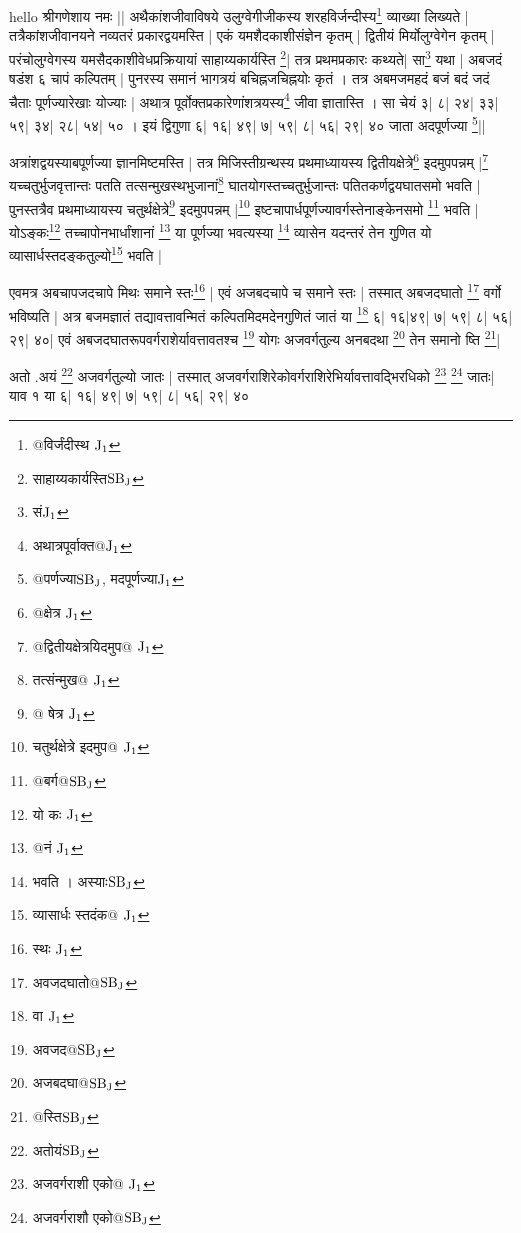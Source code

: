 \documentclass[12pt]{article}
\begin{document}
{\s  hello
श्रीगणेशाय नमः || 
अथैकांशजीवाविषये
उलुग्वेगीजीकस्य
शरहविर्जन्दीस्य\footnote{{\s @विर्जंदीस्थ }${\rm J_1}$}
व्याख्या लिख्यते |
तत्रैकांशजी\-वान\-यने नव्यतरं प्रकारद्वयमस्ति |
एकं यमशैदकाशीसंज्ञेन कृतम् |
द्वितीयं मिर्योलुग्वेगेन कृतम् |
परंचोलुग्वेगस्य यमसैदकाशीवेधप्रक्रियायां
साहाय्यकार्यस्ति \footnote{{\s साहाय्यकार्यस्ति}${\rm SB_J}$}| 
तत्र प्रथमप्रकारः कथ्यते| सा\footnote{{\s सं}${\rm J_1}$} यथा |
अबजदं षडंश ६ चापं कल्पितम् |
पुनरस्य समानं भागत्रयं बचिह्नजचिह्नयोः कृतं । 
तत्र अबमजमहदं बजं बदं जदं चैताः पूर्णज्यारेखाः
योज्याः |
अथात्र पूर्वोक्तप्रकारेणांशत्रयस्य\footnote{{\s अथात्रपूर्वाक्त@}${\rm J_1}$}
जीवा ज्ञातास्ति । सा चेयं ३| ८| २४| ३३| ५९| ३४| २८| ५४| ५० ।
इयं द्विगुणा ६| १६| ४९| ७| ५९| ८| ५६| २९| ४० जाता अदपूर्णज्या \footnote{{\s @पर्णज्या}${\rm SB_J}$, {\s मदपूर्णज्या}${\rm J_1}$}||

अत्रांशद्वयस्याबपूर्णज्या ज्ञानमिष्टमस्ति |
तत्र मिजिस्तीग्रन्थस्य
प्रथमाध्यायस्य द्वितीयक्षेत्रे\footnote{{\s @क्षेत्र }${\rm J_1}$}
इदमुपपन्नम् |\footnote{{\s @द्वितीयक्षेत्रयिदमुप@ }${\rm J_1}$}
यच्चतुर्भुजवृत्तान्तः पतति
तत्सन्मुखस्थभुजानां\footnote{{\s तत्संन्मुख@ } ${\rm J_1}$}
घातयोगस्तच्चतुर्भुजान्तः पतितकर्णद्वयघातसमो भवति |
पुनस्तत्रैव प्रथमाध्यायस्य
चतुर्थक्षेत्रे\footnote{{\s @
षेत्र }${\rm J_1}$} इदमुपपन्नम् |\footnote{{\s चतुर्थक्षेत्रे इदमुप@ }${\rm J_1}$}
इष्टचापार्धपूर्णज्यावर्गस्तेनाङ्केनसमो \footnote{{\s @बर्ग@}${\rm SB_J}$} भवति |
योऽङ्कः\footnote{{\s यो कः }${\rm J_1}$} %
 तच्चापोनभार्धांशानां \footnote{{\s @नं }${\rm J_1}$} या पूर्णज्या भवत्यस्या \footnote{{\s भवति । अस्याः}${\rm SB_J}$}
व्यासेन यदन्तरं तेन गुणित यो
व्यासार्धस्तदङ्कतुल्यो\footnote{{\s व्यासार्धः स्तदंक@ }${\rm J_1}$}
भवति |

एवमत्र अबचापजदचापे मिथः समाने स्तः\footnote{{\s स्थः }${\rm J_1}$} |
एवं अजबदचापे च समाने स्तः |
तस्मात् अबजदघातो \footnote{{\s अवजदघातो@}${\rm SB_J}$} वर्गो भविष्यति |
अत्र बजमज्ञातं तद्यावत्तावन्मितं कल्पितमिदमदेनगुणितं
जातं या \footnote{{\s वा }${\rm J_1}$} ६| १६|४९| ७| ५९| ८| ५६| २९| ४०|
एवं अबजदघातरूपवर्गराशेर्यावत्तावतश्च \footnote{{\s अवजद@}${\rm SB_J}$} योगः
अजवर्गतुल्य अनबदथा \footnote{{\s अजबदघा@}${\rm SB_J}$} तेन समानो ष्ति \footnote{{\s @स्ति}${\rm SB_J}$}|

अतो .अयं \footnote{{\s अतोयं}${\rm SB_J}$} अजवर्गतुल्यो जातः |
तस्मात्
अजवर्गराशिरेकोवर्गराशिरेभिर्यावत्तावद्भिरधिको
\footnote{{\s अजवर्गराशी एको@ }${\rm J_1}$}
\footnote{{\s अजवर्गराशौ एको@}${\rm SB_J}$}
जातः|
याव १ या ६| १६| ४९| ७| ५९| ८| ५६| २९| ४०

}
\end{document}
